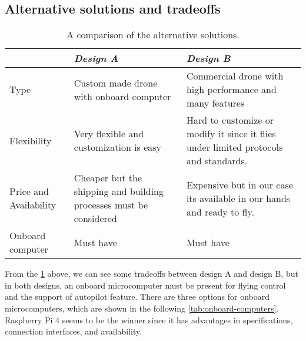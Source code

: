 \documentclass[../main.tex]{subfiles}
\begin{document}
\subsection{Alternative solutions and tradeoffs}

\begin{table}[H]
    \centering
    \caption{A comparison of the alternative solutions.}
    \label{tab:alt-solutions}
    \begin{tabular}{ p{4cm} p{6cm} p{6cm} }
        \toprule
        \textit{} & \textit{Design A} & \textit{Design B}\\ \midrule
        Type  & Custom made drone with onboard computer & Commercial drone with high performance and many features    \\
        Flexibility & Very flexible and customization is easy & Hard to customize or modify it since it flies under limited protocols and standards. \\

        Price and Availability & Cheaper but the shipping and building processes must be considered & Expensive but in our case its available in our hands and ready to fly.   \\

        Onboard computer & Must have & Must have \\
        \bottomrule
    \end{tabular}
\end{table} 

From the \cref{tab:alt-solutions} above, 
we can see some tradeoffs 
between design A and design B, but in both designs, 
an onboard microcomputer must be present for 
flying control and the support of autopilot feature. 
There are three options for onboard microcomputers, 
which are shown in the following 
\cref{tab:onboard-computers}. Raspberry Pi 4 seems 
to be the winner since it has advantages 
in specifications, connection interfaces, 
and availability.
\end{document}
